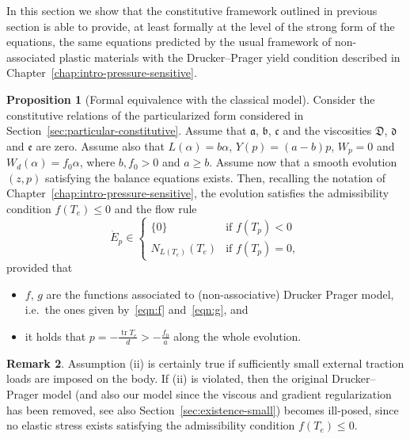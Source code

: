 \documentclass[a4paper,10pt,oneside]{amsbook}
\numberwithin{section}{chapter}
\numberwithin{equation}{chapter}
\theoremstyle{definition}
\newtheorem{prop}{Proposition}[chapter]
\newtheorem{rmk}[prop]{Remark}
\DeclareMathOperator{\tr}{tr}
\begin{document}
In this section we show that the constitutive framework outlined in previous section is able to provide, at least formally at the level of the strong form of the equations, the same equations predicted by the usual framework of non-associated plastic materials with the Drucker--Prager yield condition described in Chapter~\ref{chap:intro-pressure-sensitive}.
\begin{prop}[Formal equivalence with the classical model]
\label{prop:recovering}
Consider the constitutive relations of the particularized form considered in Section~\ref{sec:particular-constitutive}. Assume that $\mathfrak{a}$, $\mathfrak{b}$, $\mathfrak{c}$ and the viscosities $\mathfrak{D}$, $\mathfrak{d}$ and $\mathfrak{e}$ are zero. Assume also that $L(\alpha)=b\alpha$, $Y(p)=(a-b)p$, $W_p=0$ and $W_d(\alpha)=f_0\alpha$, where $b,f_0>0$ and $a\ge b$.  Assume now that a smooth evolution $(z,p)$ satisfying the balance equations exists. Then, recalling the notation of Chapter~\ref{chap:intro-pressure-sensitive}, the evolution satisfies the admissibility condition $f(T_e)\le0$ and the flow rule
\[
\dot E_p\in
\begin{cases}
\{0\} & \text{if $f(T_p)<0$} \\
N_{L(T_e)}(T_e) & \text{if $f(T_p)=0$},
\end{cases}
\]
provided that
\begin{itemize}
\item[(i)] $f$, $g$ are the functions associated to (non-associative) Drucker Prager model, i.e.\ the ones given by~\eqref{eqn:f} and~\eqref{eqn:g}, and
\item[(ii)] it holds that $p=-\frac{\tr T_e}{d}>-\frac{f_0}{a}$ along the whole evolution.
\end{itemize}
\end{prop}
\begin{rmk}
Assumption (ii) is certainly true if sufficiently small external traction loads are imposed on the body. If (ii) is violated, then the original Drucker--Prager model (and also our model since the viscous and gradient regularization has been removed, see also Section~\ref{sec:existence-small}) becomes ill-posed, since no elastic stress exists satisfying the admissibility condition $f(T_e)\le0$. 
\end{rmk}
\end{document}

